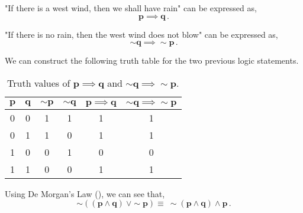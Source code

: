 \begin{subquestions}
\begin{subsubquestions}
\begin{subsubsubquestions}
	
\subsubsubquestion

"If there is a west wind, then we shall have rain" can be expressed as,
\begin{equation}
	\boldsymbol{p \implies q}\,.
\end{equation}


\subsubsubquestion

"If there is no rain, then the west wind does not blow" can be expressed as,
\begin{equation}
	\boldsymbol{\sim q \implies \sim p}\,.
\end{equation}

\end{subsubsubquestions}


\subsubquestion

We can construct the following truth table for the two previous logic statements.
\begin{table}[ht]
	\centering
	\begin{tabular}{|c|c|c|c|c|c|}
		\hline
		$\boldsymbol{p}$ & $\boldsymbol{q}$ & $\boldsymbol{\sim p}$ & $\boldsymbol{\sim q}$ & $\boldsymbol{p \implies q}$ & $\boldsymbol{\sim q \implies \sim p}$ \\
		\hline
		0 & 0 & 1 & 1 & 1 & 1 \\
	    0 & 1 & 1 & 0 & 1 & 1 \\
	    1 & 0 & 0 & 1 & 0 & 0 \\
	    1 & 1 & 0 & 0 & 1 & 1 \\
	    \hline
	\end{tabular}
	\caption{\label{2011:q1:tab:TruthTab2} Truth values of  $\boldsymbol{p \implies q}$ and $\boldsymbol{\sim q \implies \sim p}$.}
\end{table}

\end{subsubquestions}


\subquestion

Using De Morgan's Law (), we can see that,
\begin{equation}	
	\boldsymbol{\sim((p \land q) ~\lor \sim p)  \equiv ~\sim(p \land q) \land p} \,. \label{2012BoolEqn}
\end{equation}


\end{subquestions}
